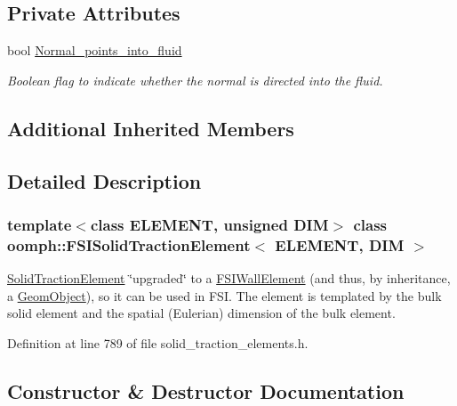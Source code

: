 \subsection*{Private Attributes}
\begin{DoxyCompactItemize}
\item 
bool \hyperlink{classoomph_1_1FSISolidTractionElement_ab00f0ee9793a838bac6d2343e42bfa7c}{Normal\+\_\+points\+\_\+into\+\_\+fluid}
\begin{DoxyCompactList}\small\item\em Boolean flag to indicate whether the normal is directed into the fluid. \end{DoxyCompactList}\end{DoxyCompactItemize}
\subsection*{Additional Inherited Members}


\subsection{Detailed Description}
\subsubsection*{template$<$class E\+L\+E\+M\+E\+NT, unsigned D\+IM$>$\newline
class oomph\+::\+F\+S\+I\+Solid\+Traction\+Element$<$ E\+L\+E\+M\+E\+N\+T, D\+I\+M $>$}

\hyperlink{classoomph_1_1SolidTractionElement}{Solid\+Traction\+Element} \char`\"{}upgraded\char`\"{} to a \hyperlink{classoomph_1_1FSIWallElement}{F\+S\+I\+Wall\+Element} (and thus, by inheritance, a \hyperlink{classoomph_1_1GeomObject}{Geom\+Object}), so it can be used in F\+SI. The element is templated by the bulk solid element and the spatial (Eulerian) dimension of the bulk element. 

Definition at line 789 of file solid\+\_\+traction\+\_\+elements.\+h.



\subsection{Constructor \& Destructor Documentation}
\mbox{\label{classoomph_1_1FSISolidTractionElement_a6b1f461ae72d6ecbd9e1b1175ee9da5d}} 
